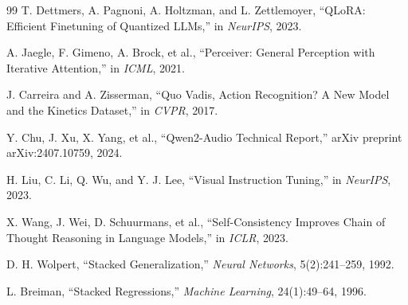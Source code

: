 \documentclass[11pt,a4paper,twocolumn]{article}
\begin{document}
\begin{thebibliography}{99}
T. Dettmers, A. Pagnoni, A. Holtzman, and L. Zettlemoyer,
``QLoRA: Efficient Finetuning of Quantized LLMs,''
in \emph{NeurIPS}, 2023.

A. Jaegle, F. Gimeno, A. Brock, et al.,
``Perceiver: General Perception with Iterative Attention,''
in \emph{ICML}, 2021.

J. Carreira and A. Zisserman,
``Quo Vadis, Action Recognition? A New Model and the Kinetics Dataset,''
in \emph{CVPR}, 2017.

Y. Chu, J. Xu, X. Yang, et al.,
``Qwen2-Audio Technical Report,''
arXiv preprint arXiv:2407.10759, 2024.

H. Liu, C. Li, Q. Wu, and Y. J. Lee,
``Visual Instruction Tuning,''
in \emph{NeurIPS}, 2023.

X. Wang, J. Wei, D. Schuurmans, et al.,
``Self-Consistency Improves Chain of Thought Reasoning in Language Models,''
in \emph{ICLR}, 2023.

D. H. Wolpert,
``Stacked Generalization,''
\emph{Neural Networks}, 5(2):241--259, 1992.

L. Breiman,
``Stacked Regressions,''
\emph{Machine Learning}, 24(1):49--64, 1996.

\end{thebibliography}
\end{document}

